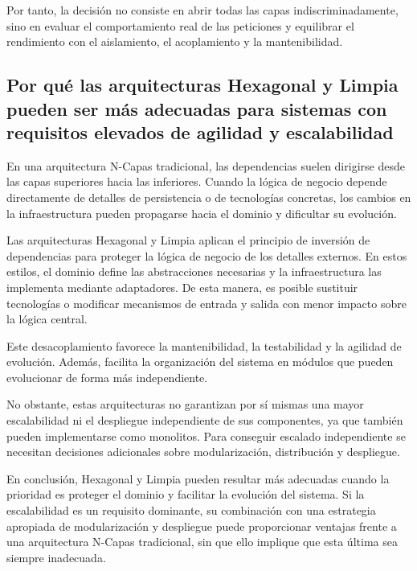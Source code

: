 \documentclass[12pt, a4paper]{article}
\begin{document}
        Por tanto, la decisión no consiste en abrir todas las capas indiscriminadamente, sino en evaluar el comportamiento real de las peticiones y equilibrar el rendimiento con el aislamiento, el acoplamiento y la mantenibilidad.

        \subsection{Por qué las arquitecturas Hexagonal y Limpia pueden ser más adecuadas para sistemas con requisitos elevados de agilidad y escalabilidad}

        En una arquitectura N-Capas tradicional, las dependencias suelen dirigirse desde las capas superiores hacia las inferiores. Cuando la lógica de negocio depende directamente de detalles de persistencia o de tecnologías concretas, los cambios en la infraestructura pueden propagarse hacia el dominio y dificultar su evolución.

        Las arquitecturas Hexagonal y Limpia aplican el principio de inversión de dependencias para proteger la lógica de negocio de los detalles externos. En estos estilos, el dominio define las abstracciones necesarias y la infraestructura las implementa mediante adaptadores. De esta manera, es posible sustituir tecnologías o modificar mecanismos de entrada y salida con menor impacto sobre la lógica central.

        Este desacoplamiento favorece la mantenibilidad, la testabilidad y la agilidad de evolución. Además, facilita la organización del sistema en módulos que pueden evolucionar de forma más independiente.

        No obstante, estas arquitecturas no garantizan por sí mismas una mayor escalabilidad ni el despliegue independiente de sus componentes, ya que también pueden implementarse como monolitos. Para conseguir escalado independiente se necesitan decisiones adicionales sobre modularización, distribución y despliegue.

        En conclusión, Hexagonal y Limpia pueden resultar más adecuadas cuando la prioridad es proteger el dominio y facilitar la evolución del sistema. Si la escalabilidad es un requisito dominante, su combinación con una estrategia apropiada de modularización y despliegue puede proporcionar ventajas frente a una arquitectura N-Capas tradicional, sin que ello implique que esta última sea siempre inadecuada.
\end{document}
